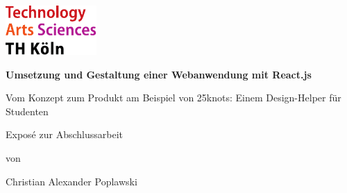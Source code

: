 \begin{titlepage}

\begin{center}

\includegraphics[width=0.26\textwidth]{images/THlogoheader.pdf}

\vspace{0.8cm}

\begin{rmfamily}
\begin{huge}
\textbf{Umsetzung und Gestaltung einer Webanwendung mit React.js}\\
\end{huge}
\vspace{0.5cm}
\begin{LARGE}
Vom Konzept zum Produkt am Beispiel von 25knots: Einem Design-Helper für Studenten
\end{LARGE}
\end{rmfamily}

\vspace{1.6cm}



\begin{LARGE}
\begin{scshape}
Exposé zur Abschlussarbeit\\[0.8em]
\end{scshape}
\end{LARGE}

\begin{large}
von\\
\vspace{0.2cm}
\begin{LARGE}
Christian Alexander Poplawski\\
\end{LARGE}
\end{large}


\end{center}
\end{titlepage}
